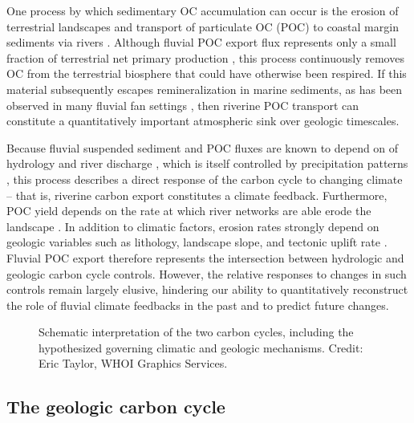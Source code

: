 One process by which sedimentary OC accumulation can occur is the erosion of terrestrial landscapes and transport of particulate OC (POC) to coastal margin sediments via rivers \citep{Ludwig:1996ul,Schlunz:2000tl}. Although fluvial POC export flux represents only a small fraction of terrestrial net primary production \citep[\textit{i.e.} $\leq 1$\%;][]{Galy:2015fx}, this process continuously removes OC from the terrestrial biosphere that could have otherwise been respired. If this material subsequently escapes remineralization in marine sediments, as has been observed in many fluvial fan settings \citep{Derry:1996um,Burdige:2005tr,Galy:2007ev,Hilton:2008fo}, then riverine POC transport can constitute a quantitatively important atmospheric  sink over geologic timescales. 

Because fluvial suspended sediment and POC fluxes are known to depend on of hydrology and river discharge \citep{Milliman:2011ug}, which is itself controlled by precipitation patterns \citep[\textit{e.g.}][]{Jian:2009bz}, this process describes a direct response of the carbon cycle to changing climate -- that is, riverine carbon export constitutes a climate feedback. Furthermore, POC yield depends on the rate at which river networks are able erode the landscape \citep{Ludwig:1996ul,Ludwig:1998ud,Galy:2015fx}. In addition to climatic factors, erosion rates strongly depend on geologic variables such as lithology, landscape slope, and tectonic uplift rate \citep{Dadson:2003kl,Milliman:2011ug,Hilton:2016dz}. Fluvial POC export therefore represents the intersection between hydrologic and geologic carbon cycle controls. However, the relative responses to changes in such controls remain largely elusive, hindering our ability to quantitatively reconstruct the role of fluvial climate feedbacks in the past and to predict future changes.

\begin{figure}[t]
	\caption[Schematic representation of Earth's two carbon cycles]{Schematic interpretation of the two carbon cycles, including the hypothesized governing climatic and geologic mechanisms. Credit: Eric Taylor, WHOI Graphics Services.}
	\label{Ch1Fig:2}
\end{figure}

\subsection{The geologic carbon cycle}

